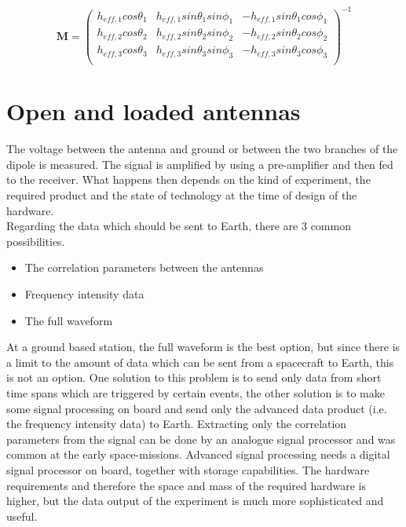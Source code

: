 \documentclass[a4paper,11pt]{report}
\begin{document}
\begin{equation}\label{eq:conversion}
 \mathbf{M}=\left(
\begin{array}{ccc}
h_{eff,1} cos \theta_1 & h_{eff,1} sin \theta_1 sin \phi_1 & -h_{eff,1} sin \theta_1 cos \phi_1 \\
h_{eff,2} cos \theta_2  & h_{eff,2} sin \theta_2 sin \phi_2 & -h_{eff,2} sin \theta_2 cos \phi_2\\
h_{eff,3} cos \theta_3 & h_{eff,3} sin \theta_3 sin \phi_3 & -h_{eff,3}  sin \theta_3 cos \phi_3\\
\end{array}%
\right)^{-1}
\end{equation}

\section{Open and loaded antennas}
The voltage between the antenna and ground or between the two branches of the dipole is measured. The signal is amplified by using a pre-amplifier and then fed to the receiver. What happens then depends on the kind of experiment, the required product and the state of technology at the time of design of the hardware.\\

Regarding the data which should be sent to Earth, there are 3 common possibilities. 

\begin{itemize}
 \item The correlation parameters between the antennas
\item Frequency intensity data
\item The full waveform
\end{itemize}

At a ground based station, the full waveform is the best option, but since there is a limit to the amount of data which can be sent from a spacecraft to Earth, this is not an option. One solution to this problem is to send only data from short time spans which are triggered by certain events, the other solution is to make some signal processing on board and send only the advanced data product (i.e. the frequency intensity data) to Earth. Extracting only the correlation parameters from the signal can be done by an analogue signal processor and was common at the early space-missions. Advanced signal processing needs a digital signal processor on board, together with storage capabilities. The hardware requirements and therefore the space and mass of the required hardware is higher, but the data output of the experiment is much more sophisticated and useful.\\
\end{document}
